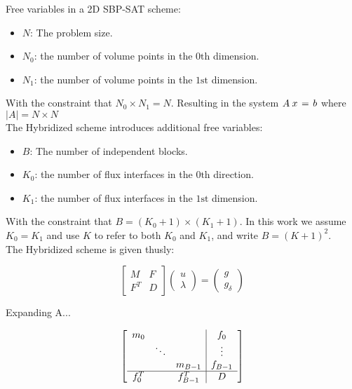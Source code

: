 Free variables in a 2D SBP-SAT scheme:
\begin{itemize} 
    \item{$N$: The problem size.}
    \item{$N_{0}$: the number of volume points in the $0\text{th}$ 
        dimension.}
    \item{$N_{1}$: the number of volume points in the $1\text{st}$ 
        dimension.}
\end{itemize}
With the constraint that 
$N_{0} \times N_{1} = N$. Resulting in the system
$A \kern 0.25em x \kern 0.125 em = \kern 0.125 em b$ 
where 
$\vert A \vert = N \times N$ \\
\noindent
The Hybridized scheme introduces additional free variables: 
\begin{itemize} 
    \item{$B$: The number of independent blocks.}
    \item{$K_{0}$: the number of flux interfaces in the $0\text{th}$ 
        direction.}
    \item{$K_{1}$: the number of flux interfaces in the $1\text{st}$ 
        dimension.}
\end{itemize}

With the constraint that $B = (K_{0} + 1) \times (K_{1} + 1)$. In this 
work we assume $K_{0} = K_{1}$ and use $K$ to refer to both $K_{0}$ and $K_{1}$, and write $B = (K + 1)^2$. \\ 

\noindent
The Hybridized scheme is given thusly: 

\begin{equation}
    \left[\begin{array}{cc}
        M & F \\
        F^T & D
    \end{array}\right] 
    \left(\begin{array}{c}
        u \\
        \lambda
    \end{array}\right) = 
    \left(\begin{array}{c}
        g \\
        g_\delta
    \end{array}\right)
\end{equation}


Expanding A...

\begin{equation}
    \left[\begin{array}{ccc | c}
        m_0 & & & f_0 \\
        & \ddots & & \vdots \\
        & & m_{B-1} & f_{B-1} \\ \hline
        f^T_0 & & f^T_{B-1} & D
    \end{array}\right] 
\end{equation}

